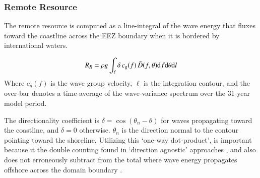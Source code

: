 \subsubsection{Remote Resource} \label{sec:method:calc:remote}

The remote resource is computed as a line-integral of the wave energy that fluxes toward the coastline across the EEZ boundary when it is bordered by international waters. 

\begin{align}
  R_R = \rho g \int_{\ell}\relax \delta \, c_g(f) \, \bar{D}(f,\theta) \mathrm{d} f \mathrm{d} \theta \mathrm{d} l
\label{eqn:RR}
\end{align}
Where $c_g(f)$ is the wave group velocity, $\ell$ is the integration contour, and
the over-bar denotes a time-average of the wave-variance spectrum over the 31-year model period. \DIFaddbegin {}\DIFaddend 

The directionality coefficient is $\delta = \cos(\theta_n - \theta)$ for waves propagating toward the coastline, and $\delta = 0$ otherwise.  $\theta_n$ is the direction normal to the contour pointing toward the shoreline. Utilizing this `one-way dot-product', is important because it \DIFdelbegin {}\DIFdelend \DIFaddbegin {}\DIFaddend the double counting found in `direction agnostic' approaches \DIFdelbegin {}\DIFdelend \DIFaddbegin {}\DIFaddend , and also does not erroneously subtract from the total where wave energy propagates offshore across the domain boundary \DIFdelbegin {}\DIFdelend \DIFaddbegin {}\DIFaddend .

